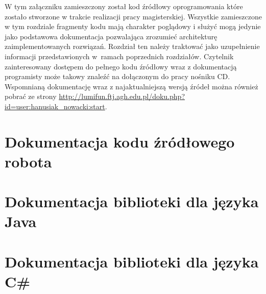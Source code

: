 \label{ch:source-code}
W tym załączniku zamieszczony został kod źródłowy oprogramowania
które zostało stworzone w trakcie realizacji pracy magisterskiej. Wszystkie
zamieszczone w tym rozdziale fragmenty kodu mają charakter poglądowy i służyć
mogą jedynie jako podstawowa dokumentacja pozwalająca zrozumieć architekturę
zaimplementowanych rozwiązań. Rozdział ten należy traktować jako
uzupełnienie informacji przedstawionych w~ramach poprzednich rozdziałów.
Czytelnik zainteresowany dostępem do pełnego kodu źródłowy wraz z dokumentacją
programisty może takowy znaleźć na dołączonym do pracy nośniku CD. Wspomnianą
dokumentację wraz z najaktualniejszą wersją źródeł można również pobrać ze
strony \url{http://lumifun.ftj.agh.edu.pl/doku.php?id=user:hanusiak_nowacki:start}.

\section{Dokumentacja kodu źródłowego robota}
\section{Dokumentacja biblioteki dla języka Java}
\section{Dokumentacja biblioteki dla języka C\#}
 


 